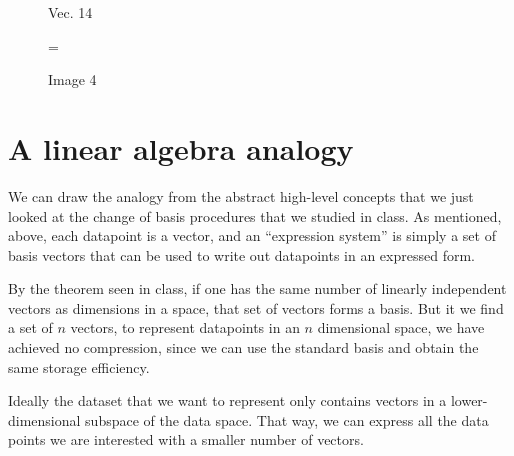 \documentclass[12pt]{report}
\begin{document}
\begin{figure}[H]
                \begin{minipage}{0.1\textwidth}
                    \centering
                    Vec. 14
                \end{minipage}
                \begin{minipage}{0.035\textwidth}
                    \centering
                    \quad=\quad
                \end{minipage}
                \begin{minipage}{0.1\textwidth}
                    \centering
                    Image 4
                \end{minipage}%
            \end{figure}

        \section{A linear algebra analogy}
            We can draw the analogy from the abstract high-level concepts that we just looked at the change of basis procedures that we studied in class. As mentioned, above, each datapoint is a vector, and an ``expression system'' is simply a set of basis vectors that can be used to write out datapoints in an expressed form.

            By the theorem seen in class, if one has the same number of linearly independent vectors as dimensions in a space, that set of vectors forms a basis. But it we find a set of $n$ vectors, to represent datapoints in an $n$ dimensional space, we have achieved no compression, since we can use the standard basis and obtain the same storage efficiency.
            
            Ideally the dataset that we want to represent only contains vectors in a lower-dimensional subspace of the data space. That way, we can express all the data points we are interested with a smaller number of vectors.
            
\end{document}
